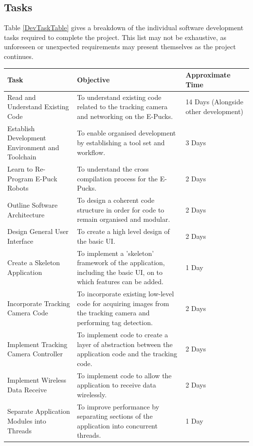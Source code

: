 \documentclass[titlepage,hidelinks,10pt]{article}
\begin{document}
\subsection{Tasks}\label{Tasks}
Table \ref{DevTaskTable} gives a breakdown of the individual software development tasks required to complete the project. This list may not be exhaustive, as unforeseen or unexpected requirements may present themselves as the project continues.

\begin{table}[H]
\begin{tabular}[h]{ |>{\raggedright}p{5cm}|>{\raggedright}p{7cm}|p{3cm}| }
  \hline
  Task & Objective & Approximate Time \\\hline
  Read and Understand Existing Code 				& To understand existing code related to the tracking camera and networking on the E-Pucks. 							& 14 Days (Alongside other development)\\ \hline
  Establish Development Environment and Toolchain 	& To enable organised development by establishing a tool set and workflow. 												& 3 Days \\ \hline
  Learn to Re-Program E-Puck Robots 				& To understand the cross compilation process for the E-Pucks. 															& 2 Days \\ \hline
  Outline Software Architecture 					& To design a coherent code structure in order for code to remain organised and modular. 								& 2 Days \\ \hline
  Design General User Interface 					& To create a high level design of the basic UI. 																		& 2 Days \\ \hline
  Create a Skeleton Application 					& To implement a 'skeleton' framework of the application, including the basic UI, on to which features can be added. 	& 1 Day \\ \hline
  Incorporate Tracking Camera Code 					& To incorporate existing low-level code for acquiring images from the tracking camera and performing tag detection. 	& 2 Days \\ \hline
  Implement Tracking Camera Controller 				& To implement code to create a layer of abstraction between the application code and the tracking code. 				& 2 Days \\ \hline
  Implement Wireless Data Receive 					& To implement code to allow the application to receive data wirelessly. 												& 2 Days \\ \hline
  Separate Application Modules into Threads 		& To improve performance by separating sections of the application into concurrent threads. 							& 1 Day \\ \hline

\end{tabular}
\end{table}
\end{document}
